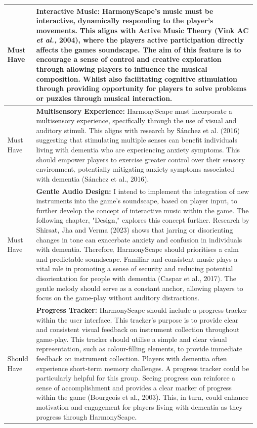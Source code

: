 \documentclass{l4proj}
\begin{document}
\begin{longtable}{|p{4cm}|p{10cm}|}
Must Have & \textbf{Interactive Music:} HarmonyScape's music must be interactive, dynamically responding to the player's movements. This aligns with Active Music Theory (Vink AC \emph{et al.,} 2004), where the players active participation directly affects the games soundscape. The aim of this feature is to encourage a sense of control and creative exploration through allowing players to influence the musical composition. Whilst also facilitating cognitive stimulation through providing opportunity for players to solve problems or puzzles through musical interaction. \\ 
\hline
Must Have & \textbf{Multisensory Experience:} HarmonyScape must incorporate a multisensory experience, specifically through the use of visual and auditory stimuli. This aligns with research by Sánchez et al. (2016) suggesting that stimulating multiple senses can benefit individuals living with dementia who are experiencing anxiety symptoms. This should empower players to exercise greater control over their sensory environment, potentially mitigating anxiety symptoms associated with dementia (Sánchez et al., 2016). \\
\hline 
Must Have & \textbf{Gentle Audio Design:} I intend to implement the integration of new instruments into the game's soundscape, based on player input, to further develop the concept of interactive music within the game. The following chapter, "Design," explores this concept further. Research by Shirsat, Jha and Verma (2023) shows that jarring or disorienting changes in tone can exacerbate anxiety and confusion in individuals with dementia. Therefore, HarmonyScape should prioritises a calm and predictable soundscape. Familiar and consistent music plays a vital role in promoting a sense of security and reducing potential disorientation for people with dementia (Caspar et al., 2017). The gentle melody should serve as a constant anchor, allowing players to focus on the game-play without auditory distractions.  \\ 
\hline
Should Have & \textbf{Progress Tracker:} HarmonyScape should include a progress tracker within the user interface. This tracker's purpose is to provide clear and consistent visual feedback on instrument collection throughout game-play. This tracker should utilise a simple and clear visual representation, such as colour-filling elements, to provide immediate feedback on instrument collection. Players with dementia often experience short-term memory challenges. A progress tracker could be particularly helpful for this group. Seeing progress can reinforce a sense of accomplishment and provides a clear marker of progress within the game (Bourgeois et al., 2003). This, in turn, could enhance motivation and engagement for players living with dementia as they progress through HarmonyScape. \\ 

\end{longtable}
\end{document}
